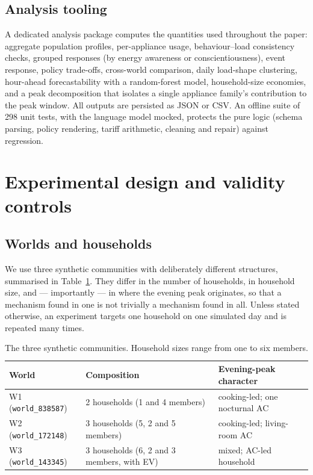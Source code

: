 \documentclass[11pt]{article}
\begin{document}
\subsection{Analysis tooling}
A dedicated analysis package computes the quantities used throughout the paper: aggregate population
profiles, per-appliance usage, behaviour--load consistency checks, grouped responses (by energy awareness
or conscientiousness), event response, policy trade-offs, cross-world comparison, daily load-shape
clustering, hour-ahead forecastability with a random-forest model, household-size economies, and a peak
decomposition that isolates a single appliance family's contribution to the peak window. All outputs are
persisted as JSON or CSV. An offline suite of 298 unit tests, with the language model mocked, protects the
pure logic (schema parsing, policy rendering, tariff arithmetic, cleaning and repair) against regression.

\section{Experimental design and validity controls}

\subsection{Worlds and households}
We use three synthetic communities with deliberately different structures, summarised in
Table~\ref{tab:worlds}. They differ in the number of households, in household size, and --- importantly
--- in where the evening peak originates, so that a mechanism found in one is not trivially a mechanism
found in all. Unless stated otherwise, an experiment targets one household on one simulated day and is
repeated many times.

\begin{table}[ht]
\centering\small
\begin{tabular}{lll}
\toprule
World & Composition & Evening-peak character \\
\midrule
W1 (\texttt{world\_838587}) & 2 households (1 and 4 members) & cooking-led; one nocturnal AC \\
W2 (\texttt{world\_172148}) & 3 households (5, 2 and 5 members) & cooking-led; living-room AC \\
W3 (\texttt{world\_143345}) & 3 households (6, 2 and 3 members, with EV) & mixed; AC-led household \\
\bottomrule
\end{tabular}
\caption{The three synthetic communities. Household sizes range from one to six members.}
\label{tab:worlds}
\end{table}
\end{document}
